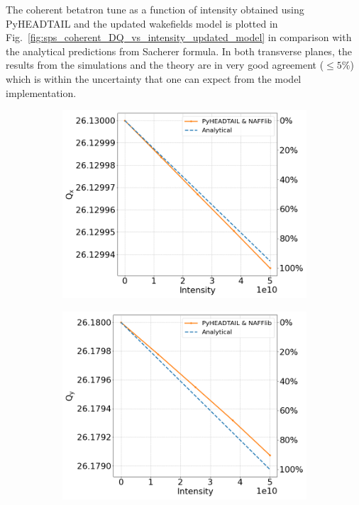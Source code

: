  The coherent betatron tune as a function of intensity obtained using PyHEADTAIL and the updated wakefields model is plotted in Fig.~\ref{fig:sps_coherent_DQ_vs_intensity_updated_model} in comparison with the analytical predictions from Sacherer formula. In both transverse planes, the results from the simulations and the theory are in very good agreement ($\leq 5\%$) which is within the uncertainty that one can expect from the model implementation. 

\begin{figure}[!ht]
    \centering
    \begin{subfigure}[t]{0.45\textwidth}
        \centering
        \includegraphics[width=1\textwidth]{images/Ch7/Qx_vs_intensity_complete_impedance_sps_q26model_updated_MD2018_parameters_integer.png}
    \end{subfigure}
    \hfill
    \begin{subfigure}[t]{0.45\textwidth}
        \centering
        \includegraphics[width=1\textwidth]{images/Ch7/Qy_vs_intensity_complete_impedance_sps_q26model_updated_MD2018_parameters_integer.png}

\end{subfigure}
\end{figure}
